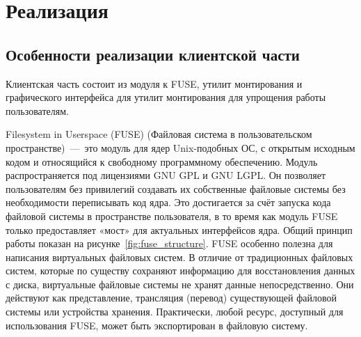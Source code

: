 \documentclass[utf8,usehyperref,12pt]{G7-32}
\begin{document}
\chapter{Реализация}

\section{Особенности реализации клиентской части}
Клиентская часть состоит из модуля к FUSE, утилит монтирования и графического интерфейса для утилит монтирования для упрощения работы пользователям. 

Filesystem in Userspace (FUSE) (Файловая система в пользовательском пространстве)~—~это модуль для ядер Unix-подобных ОС, с открытым исходным кодом и относящийся к свободному программному обеспечению. Модуль распространяется под лицензиями GNU GPL и GNU LGPL. Он позволяет пользователям без привилегий создавать их собственные файловые системы без необходимости переписывать код ядра. Это достигается за счёт запуска кода файловой системы в пространстве пользователя, в то время как модуль FUSE только предоставляет «мост» для актуальных интерфейсов ядра. Общий принцип работы показан на рисунке~\ref{fig:fuse_structure}. FUSE особенно полезна для написания виртуальных файловых систем. В отличие от традиционных файловых систем, которые по существу сохраняют информацию для восстановления данных с диска, виртуальные файловые системы не хранят данные непосредственно. Они действуют как представление, трансляция (перевод) существующей файловой системы или устройства хранения. Практически, любой ресурс, доступный для использования FUSE, может быть экспортирован в файловую систему.
\end{document}
